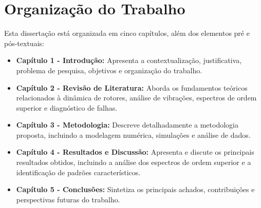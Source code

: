 \section{Organização do Trabalho}

Esta dissertação está organizada em cinco capítulos, além dos elementos pré e pós-textuais:

\begin{itemize}
    \item \textbf{Capítulo 1 - Introdução:} Apresenta a contextualização, justificativa, problema de pesquisa, objetivos e organização do trabalho.
    
    \item \textbf{Capítulo 2 - Revisão de Literatura:} Aborda os fundamentos teóricos relacionados à dinâmica de rotores, análise de vibrações, espectros de ordem superior e diagnóstico de falhas.
    
    \item \textbf{Capítulo 3 - Metodologia:} Descreve detalhadamente a metodologia proposta, incluindo a modelagem numérica, simulações e análise de dados.
    
    \item \textbf{Capítulo 4 - Resultados e Discussão:} Apresenta e discute os principais resultados obtidos, incluindo a análise dos espectros de ordem superior e a identificação de padrões característicos.
    
    \item \textbf{Capítulo 5 - Conclusões:} Sintetiza os principais achados, contribuições e perspectivas futuras do trabalho.
\end{itemize}
